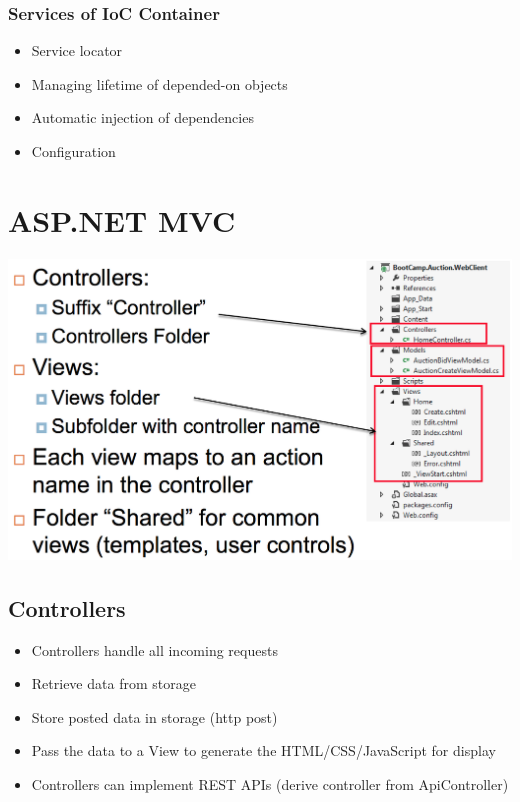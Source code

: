 \documentclass[10pt]{article}
\begin{document}
\subsubsection{Services of IoC Container}
\begin{itemize}
	\item Service locator
	\item Managing lifetime of depended-on objects
	\item Automatic injection of dependencies
	\item Configuration
\end{itemize}

\pagebreak
\section{ASP.NET MVC}
\begin{center}
	\includegraphics[scale=0.3]{mvc.png}
\end{center}
\subsection{Controllers}
\begin{itemize}
	\item Controllers handle all incoming requests
	\item Retrieve data from storage
	\item Store posted data in storage (http post)
	\item Pass the data to a View to generate the HTML/CSS/JavaScript for display
	\item Controllers can implement REST APIs (derive controller from ApiController)
\end{itemize}
\end{document}
